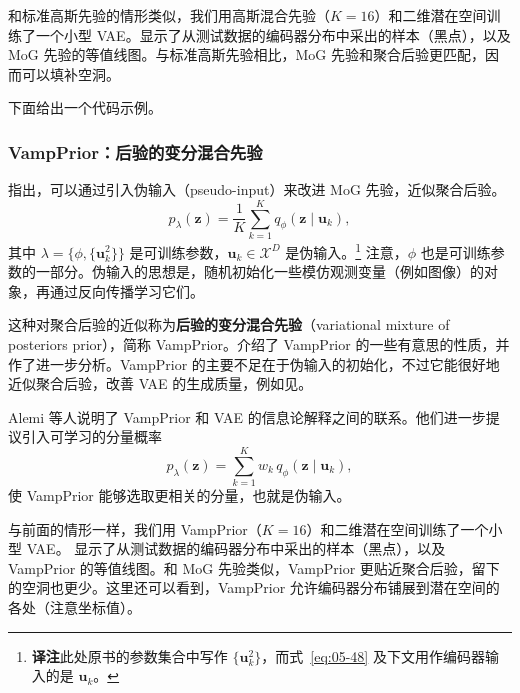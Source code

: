 和标准高斯先验的情形类似，我们用高斯混合先验（$K=16$）和二维潜在空间训练了一个小型 VAE。显示了从测试数据的编码器分布中采出的样本（黑点），以及 MoG 先验的等值线图。与标准高斯先验相比，MoG 先验和聚合后验更匹配，因而可以填补空洞。

下面给出一个代码示例。


\subsubsection{VampPrior：后验的变分混合先验}
指出，可以通过引入伪输入（pseudo-input）来改进 MoG 先验，近似聚合后验。
\begin{equation}
p_\lambda(\mathbf{z})=\frac{1}{K}\sum_{k=1}^K q_\phi(\mathbf{z}\mid\mathbf{u}_k),
\tag{5.48}\label{eq:05-48}
\end{equation}
其中 $\lambda=\bigl\{\phi,\{\mathbf{u}_k^2\}\bigr\}$ 是可训练参数，$\mathbf{u}_k\in\mathcal{X}^D$ 是伪输入。\footnote{\textbf{译注}\quad 此处原书的参数集合中写作 $\{\mathbf{u}_k^2\}$，而式~\eqref{eq:05-48} 及下文用作编码器输入的是 $\mathbf{u}_k$。} 注意，$\phi$ 也是可训练参数的一部分。伪输入的思想是，随机初始化一些模仿观测变量（例如图像）的对象，再通过反向传播学习它们。

这种对聚合后验的近似称为\textbf{后验的变分混合先验}（variational mixture of posteriors prior），简称 VampPrior。介绍了 VampPrior 的一些有意思的性质，并作了进一步分析。VampPrior 的主要不足在于伪输入的初始化，不过它能很好地近似聚合后验，改善 VAE 的生成质量，例如见。

Alemi 等人说明了 VampPrior 和 VAE 的信息论解释之间的联系。他们进一步提议引入可学习的分量概率
\begin{equation}
p_\lambda(\mathbf{z})=\sum_{k=1}^K w_k\,q_\phi(\mathbf{z}\mid\mathbf{u}_k),
\tag{5.49}\label{eq:05-49}
\end{equation}
使 VampPrior 能够选取更相关的分量，也就是伪输入。

与前面的情形一样，我们用 VampPrior（$K=16$）和二维潜在空间训练了一个小型 VAE。
显示了从测试数据的编码器分布中采出的样本（黑点），以及 VampPrior 的等值线图。和 MoG 先验类似，VampPrior 更贴近聚合后验，留下的空洞也更少。这里还可以看到，VampPrior 允许编码器分布铺展到潜在空间的各处（注意坐标值）。

